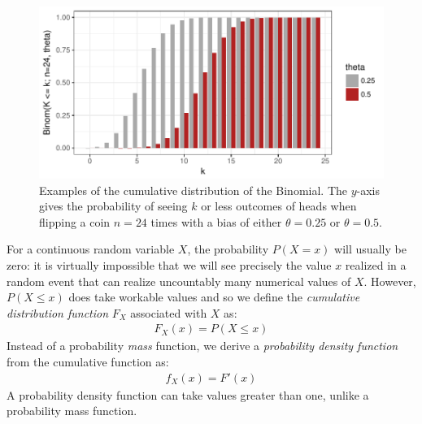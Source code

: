 \documentclass[nobib,nofonts]{tufte-handout}
\renewcommand{\markdef}[1]{\emph{#1}}
\begin{document}
\begin{example}
\begin{figure}
  \centering
  \includegraphics[width=\textwidth]{00-pics/05_00_binomial-distribution-cumulative.pdf}
  \caption{Examples of the cumulative distribution of the Binomial. The $y$-axis gives the
    probability of seeing $k$ or less outcomes of heads when flipping a coin $n=24$ times with
    a bias of either $\theta = 0.25$ or $\theta = 0.5$.}
  \label{fig:BinomialDistributionCumulative}
\end{figure}

\end{example}

For a continuous random variable $X$, the probability $P(X = x)$ will usually be zero: it is
virtually impossible that we will see precisely the value $x$ realized in a random event that
can realize uncountably many numerical values of $X$. However, $P(X \le x)$ does take workable
values and so we define the \markdef{cumulative distribution function} $F_X$
associated with $X$ as:
\begin{align*}
  F_X(x) = P(X \le x)
\end{align*}
Instead of a probability \emph{mass} function, we derive a \markdef{probability density
  function} from the cumulative function as:
\begin{align*}
  f_X(x) = F'(x)
\end{align*}
A probability density function can take values greater than one, unlike a probability mass
function.
\end{document}
